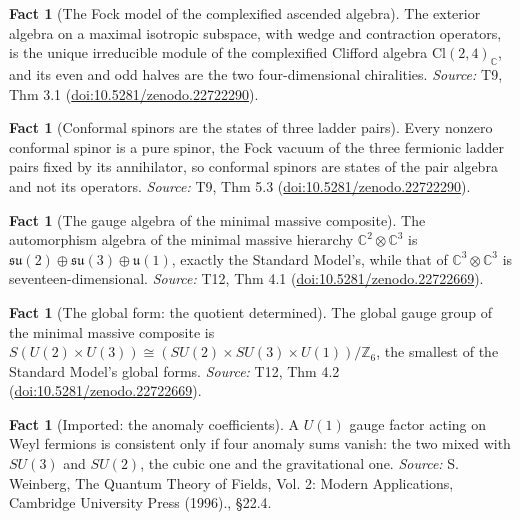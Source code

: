 \documentclass[11pt]{article}
\theoremstyle{definition}
\newtheorem{fact}[theorem]{Fact}
\theoremstyle{plain}
\providecommand{\C}{}\renewcommand{\C}{\mathbb{C}}
\providecommand{\Cl}{}\renewcommand{\Cl}{\mathrm{Cl}}
\providecommand{\su}{}\renewcommand{\su}{\mathfrak{su}}
\providecommand{\uu}{}\renewcommand{\uu}{\mathfrak{u}}
\begin{document}
\begin{fact}[The Fock model of the complexified ascended algebra]\label{c:correspondence.fock-model-complexified-ascended-algebra}
The exterior algebra on a maximal isotropic subspace, with wedge and contraction operators, is the unique irreducible module of the complexified Clifford algebra $\Cl(2,4)_\C$, and its even and odd halves are the two four-dimensional chiralities.
\emph{Source:} T9, Thm 3.1 (\href{https://doi.org/10.5281/zenodo.22722290}{doi:10.5281/zenodo.22722290}).
\end{fact}

\begin{fact}[Conformal spinors are the states of three ladder pairs]\label{c:correspondence.twistors-are-states-three-ladder-pairs}
Every nonzero conformal spinor is a pure spinor, the Fock vacuum of the three fermionic ladder pairs fixed by its annihilator, so conformal spinors are states of the pair algebra and not its operators.
\emph{Source:} T9, Thm 5.3 (\href{https://doi.org/10.5281/zenodo.22722290}{doi:10.5281/zenodo.22722290}).
\end{fact}

\begin{fact}[The gauge algebra of the minimal massive composite]\label{c:standard-model.gauge-algebra-minimal-massive-composite}
The automorphism algebra of the minimal massive hierarchy $\C^{2} \otimes \C^{3}$ is $\su(2) \oplus \su(3) \oplus \uu(1)$, exactly the Standard Model's, while that of $\C^{3} \otimes \C^{3}$ is seventeen-dimensional.
\emph{Source:} T12, Thm 4.1 (\href{https://doi.org/10.5281/zenodo.22722669}{doi:10.5281/zenodo.22722669}).
\end{fact}

\begin{fact}[The global form: the quotient determined]\label{c:standard-model.global-form-quotient-determined}
The global gauge group of the minimal massive composite is $S(U(2) \times U(3)) \cong (SU(2) \times SU(3) \times U(1))/\mathbb{Z}_{6}$, the smallest of the Standard Model's global forms.
\emph{Source:} T12, Thm 4.2 (\href{https://doi.org/10.5281/zenodo.22722669}{doi:10.5281/zenodo.22722669}).
\end{fact}

\begin{fact}[Imported: the anomaly coefficients]\label{c:standard-model.imported-anomaly-coefficients}
A $U(1)$ gauge factor acting on Weyl fermions is consistent only if four anomaly sums vanish: the two mixed with $SU(3)$ and $SU(2)$, the cubic one and the gravitational one.
\emph{Source:} S. Weinberg, The Quantum Theory of Fields, Vol. 2: Modern Applications, Cambridge University Press (1996)., \S 22.4.
\end{fact}
\end{document}
